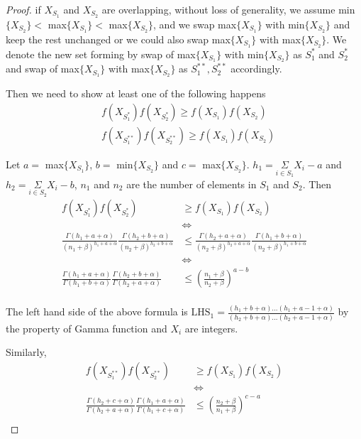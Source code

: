 \documentclass[aoas,preprint]{imsart}
\begin{document}
\begin{proof}
if $X_{S_1}$ and $X_{S_2}$ are overlapping, without loss of generality, we assume min$\{X_{S_2}\}  <$ max$\{X_{S_1}\}  <$ max$\{X_{S_2}\}$, and we swap max$\{X_{S_1}\}$ with min$\{X_{S_2}\}$ and keep the rest unchanged or we could also swap max$\{X_{S_1}\}$ with max$\{X_{S_2}\}$. We denote the new set forming by swap of max$\{X_{S_1}\}$ with min$\{X_{S_2}\}$  as $S_1^*$ and $S_2^*$ and swap of max$\{X_{S_1}\}$ with max$\{X_{S_2}\}$ as $S_1^{**}, S_2^{**}$ accordingly.

Then we need to show  at least one of the following happens
\begin{align}
&f(X_{S_1^*}) f(X_{S_2^*}) \geq f(X_{S_1}) f(X_{S_2})\\
&f(X_{S_1^{**}}) f(X_{S_2^{**}}) \geq f(X_{S_1}) f(X_{S_2})
\end{align}


Let $a =$ max$\{X_{S_1}\}$, $b = $ min$\{X_{S_2}\}$ and $c = $ max$\{X_{S_2}\}$. $h_1 = \underset{i \in S_1}{\Sigma} X_i - a$ and $h_2 = \underset{i \in S_2}{\Sigma} X_i - b$, $n_1$ and $n_2$ are the number of elements in $S_1$ and $S_2$. Then
\begin{align*}
f(X_{S_1^*}) f(X_{S_2^*}) &\geq f(X_{S_1}) f(X_{S_2})\\
&\iff\\
\frac{\Gamma(h_1 + a + \alpha)}{(n_1 + \beta)^{h_1 + a +\alpha}} \frac{\Gamma(h_2 + b + \alpha)}{(n_2 + \beta)^{h_2 + b + \alpha}} &\leq \frac{\Gamma(h_2 + a + \alpha)}{(n_2 + \beta)^{h_2+ a +\alpha}} \frac{\Gamma(h_1 + b + \alpha)}{(n_2 + \beta)^{h_1 + b + \alpha}}\\
&\iff\\
\frac{\Gamma(h_1 + a + \alpha)}{\Gamma(h_1 + b + \alpha)} \frac{\Gamma(h_2 + b + \alpha)}{\Gamma(h_2 + a + \alpha)} &\leq (\frac{n_1 + \beta}{n_2 + \beta})^{a - b} \\
\end{align*}

The left hand side of the above formula is $\text{LHS}_1 = \frac{(h_1 + b + \alpha)...(h_1 + a - 1 + \alpha)}{(h_2 + b + \alpha) ... (h_2 + a - 1 + \alpha)}$ by the property of Gamma function and $X_i$ are integers.

Similarly,
\begin{align*}
f(X_{S_1^{**}}) f(X_{S_2^{**}}) &\geq f(X_{S_1}) f(X_{S_2})\\
&\iff\\
\frac{\Gamma(h_2 + c + \alpha)}{\Gamma(h_2 + a + \alpha)} \frac{\Gamma(h_1 + a + \alpha)}{\Gamma(h_1 + c + \alpha)} &\leq (\frac{n_2 + \beta}{n_1 + \beta})^{c - a} \\
\end{align*}


\end{proof}
\end{document}
